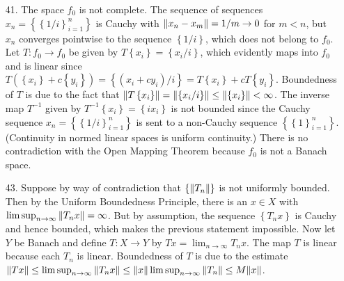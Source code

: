 \documentclass[11pt,leqno]{article}
\theoremstyle{plain}
\theoremstyle{definition}
\numberwithin{equation}{section}
\numberwithin{lem}{section}
\newcommand{\cbr}[1]{\left\{#1\right\}}
\begin{document}
\begin{enumerate}
  \item[41.] The space $f_0$ is not complete. The sequence of sequences $x_n = \cbr{\cbr{1/i}_{i=1}^n}$ is Cauchy with $\norm{x_n-x_m} = 1/m\to 0$ for $m<n$, but $x_n$ converges pointwise to the sequence $\cbr{1/i}$, which does not belong to $f_0$. Let $T\colon f_0\to f_0$ be given by $T\cbr{x_i}= \cbr{x_i/i}$, which evidently maps into $f_0$ and is linear since $T(\cbr{x_i} + c\cbr{y_i}) = \cbr{(x_i+cy_i)/i} = T\cbr{x_i} + cT\cbr{y_i}$. Boundedness of $T$ is due to the fact that $\norm{T\cbr{x_i}} = \norm{\cbr{x_i/i}}\leq \norm{\cbr{x_i}}<\infty$. The inverse map $T^{-1}$ given by $T^{-1}\cbr{x_i} = \cbr{ix_i}$ is not bounded since the Cauchy sequence $x_n = \cbr{\cbr{1/i}_{i=1}^n}$ is sent to a non-Cauchy sequence $\cbr{\cbr{1}_{i=1}^n}$. (Continuity in normed linear spaces is uniform continuity.) There is no contradiction with the Open Mapping Theorem because $f_0$ is not a Banach space.
  
  \item[43.] Suppose by way of contradiction that $\cbr{\norm{T_n}}$ is not uniformly bounded. Then by the Uniform Boundedness Principle, there is an $x\in X$ with $\limsup_{n\to\infty}\norm{T_nx} = \infty$. But by assumption, the sequence $\cbr{T_nx}$ is Cauchy and hence bounded, which makes the previous statement impossible. Now let $Y$ be Banach and define $T\colon X\to Y$ by $Tx = \lim_{n\to\infty} T_nx$. The map $T$ is linear because each $T_n$ is linear. Boundedness of $T$ is due to the estimate $\norm{Tx} \leq \limsup_{n\to\infty}\norm{T_nx}\leq \norm{x}\limsup_{n\to\infty}\norm{T_n}\leq M\norm{x}$.
  
\end{enumerate}
\end{document}
